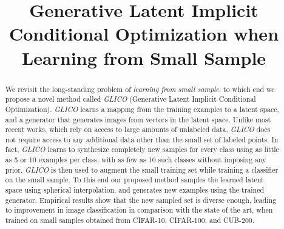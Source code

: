 \documentclass[a4paper,conference]{IEEEtran}
\begin{document}
\title{Generative Latent Implicit Conditional Optimization when Learning from Small Sample}



\author{
	\and
}

\maketitle

\begin{abstract}
    	We revisit the long-standing problem of \textit{learning from small sample}, to which end we propose a novel method called \textit{GLICO} (Generative Latent Implicit Conditional Optimization). \textit{GLICO} learns a mapping from the training examples to a latent space, and a generator that generates images from vectors in the latent space. Unlike most recent works, which rely on access to large amounts of unlabeled data, \textit{GLICO} does not require access to any additional data other than the small set of labeled points.	In fact, \textit{GLICO} learns to synthesize completely new samples for every class using as little as 5 or 10 examples per class, with as few as 10 such classes without imposing any prior. \textit{GLICO} is then used to augment the small training set while training a classifier on the small sample. To this end our proposed method samples the learned latent space using spherical interpolation, and generates new examples using the trained generator. Empirical results show that the new sampled set is diverse enough, leading to improvement in image classification in comparison with the state of the art, when trained on small samples obtained from CIFAR-10, CIFAR-100, and CUB-200.
			
\end{abstract}


\maketitle
\thispagestyle{firstpage}
\end{document}
